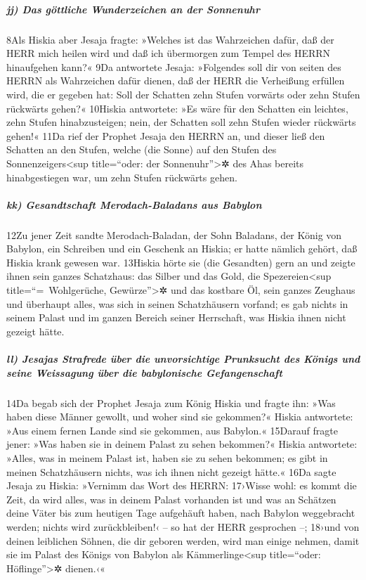 \hypertarget{jj-das-guxf6ttliche-wunderzeichen-an-der-sonnenuhr}{%
\subparagraph{jj) Das göttliche Wunderzeichen an der
Sonnenuhr}\label{jj-das-guxf6ttliche-wunderzeichen-an-der-sonnenuhr}}

8Als Hiskia aber Jesaja fragte: »Welches ist das Wahrzeichen dafür, daß
der HERR mich heilen wird und daß ich übermorgen zum Tempel des HERRN
hinaufgehen kann?« 9Da antwortete Jesaja: »Folgendes soll dir von seiten
des HERRN als Wahrzeichen dafür dienen, daß der HERR die Verheißung
erfüllen wird, die er gegeben hat: Soll der Schatten zehn Stufen
vorwärts oder zehn Stufen rückwärts gehen?« 10Hiskia antwortete: »Es
wäre für den Schatten ein leichtes, zehn Stufen hinabzusteigen; nein,
der Schatten soll zehn Stufen wieder rückwärts gehen!« 11Da rief der
Prophet Jesaja den HERRN an, und dieser ließ den Schatten an den Stufen,
welche (die Sonne) auf den Stufen des Sonnenzeigers\textless sup
title=``oder: der Sonnenuhr''\textgreater✲ des Ahas bereits
hinabgestiegen war, um zehn Stufen rückwärts gehen.

\hypertarget{kk-gesandtschaft-merodach-baladans-aus-babylon}{%
\subparagraph{kk) Gesandtschaft Merodach-Baladans aus
Babylon}\label{kk-gesandtschaft-merodach-baladans-aus-babylon}}

12Zu jener Zeit sandte Merodach-Baladan, der Sohn Baladans, der König
von Babylon, ein Schreiben und ein Geschenk an Hiskia; er hatte nämlich
gehört, daß Hiskia krank gewesen war. 13Hiskia hörte sie (die Gesandten)
gern an und zeigte ihnen sein ganzes Schatzhaus: das Silber und das
Gold, die Spezereien\textless sup title=``=~Wohlgerüche,
Gewürze''\textgreater✲ und das kostbare Öl, sein ganzes Zeughaus und
überhaupt alles, was sich in seinen Schatzhäusern vorfand; es gab nichts
in seinem Palast und im ganzen Bereich seiner Herrschaft, was Hiskia
ihnen nicht gezeigt hätte.

\hypertarget{ll-jesajas-strafrede-uxfcber-die-unvorsichtige-prunksucht-des-kuxf6nigs-und-seine-weissagung-uxfcber-die-babylonische-gefangenschaft}{%
\subparagraph{ll) Jesajas Strafrede über die unvorsichtige Prunksucht
des Königs und seine Weissagung über die babylonische
Gefangenschaft}\label{ll-jesajas-strafrede-uxfcber-die-unvorsichtige-prunksucht-des-kuxf6nigs-und-seine-weissagung-uxfcber-die-babylonische-gefangenschaft}}

14Da begab sich der Prophet Jesaja zum König Hiskia und fragte ihn: »Was
haben diese Männer gewollt, und woher sind sie gekommen?« Hiskia
antwortete: »Aus einem fernen Lande sind sie gekommen, aus Babylon.«
15Darauf fragte jener: »Was haben sie in deinem Palast zu sehen
bekommen?« Hiskia antwortete: »Alles, was in meinem Palast ist, haben
sie zu sehen bekommen; es gibt in meinen Schatzhäusern nichts, was ich
ihnen nicht gezeigt hätte.« 16Da sagte Jesaja zu Hiskia: »Vernimm das
Wort des HERRN: 17›Wisse wohl: es kommt die Zeit, da wird alles, was in
deinem Palast vorhanden ist und was an Schätzen deine Väter bis zum
heutigen Tage aufgehäuft haben, nach Babylon weggebracht werden; nichts
wird zurückbleiben!‹ -- so hat der HERR gesprochen --; 18›und von deinen
leiblichen Söhnen, die dir geboren werden, wird man einige nehmen, damit
sie im Palast des Königs von Babylon als Kämmerlinge\textless sup
title=``oder: Höflinge''\textgreater✲ dienen.‹«

